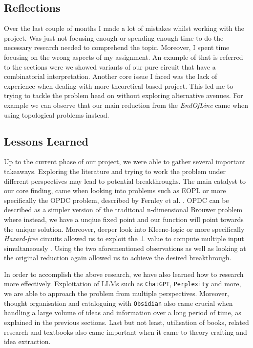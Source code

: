 \subsection{Reflections}

Over the last couple of months I made a lot of mistakes whilst working with the project.
Was just not focusing enough or spending enough time to do the necessary research needed
to comprehend the topic. Moreover, I spent time focusing on the wrong aspects of my assignment.
An example of that is referred to the sections were we showed variants of our pure circuit
that have a combinatorial interpretation. Another core issue I faced was the lack
of experience when dealing with more theoretical based project. This led me to
trying to tackle the problem head on without exploring alternative avenues. For example 
we can observe that our main reduction from the \textit{EndOfLine} came
when using topological problems instead. 

\subsection{Lessons Learned}

Up to the current phase of our project, we were able to gather several important takeaways.
Exploring the literature and trying to work the problem under different perspectives
may lead to potential breakthroughs. The main catalyst to our core finding, came
when looking into problems such as \textsc{EOPL} or more specifically
the \textsc{OPDC} problem, described by Fernley et al. \cite{fearnley_UniqueEndPotential_2020}.
\textsc{OPDC} can be described as a simpler version of the traditonal n-dimensional Brouwer problem
where instead, we have a unqiue fixed point and our function will point towards the unique solution.
Moreover, deeper look into Kleene-logic or more specifically \textit{Hazard-free} circuits allowed
us to exploit the $\bot$ value to compute multiple input simultaneously \cite{ikenmeyer_ComplexityHazardfreeCircuits_2019}.
Using the two aforementioned observations as well as looking at the original reduction again allowed us to achieve
the desired breakthrough.

In order to accomplish the above research, we have also learned how to research more effectively.
Exploitation of LLMs such as \texttt{ChatGPT}, \texttt{Perplexity} and more, we are able to
approach the problem from multiple perspectives. Moreover, thought organisation and cataloguing with
\texttt{Obsidian}
also came crucial when handling a large volume of ideas and information over a long period of time,
as explained in the previous sections. Last but not least, utilisation of books,
related research and textbooks also came important when it came to theory crafting and idea extraction.

